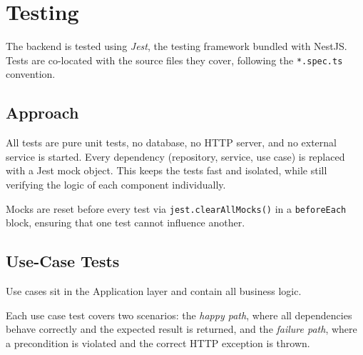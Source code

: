 \section{Testing}\label{sec:testing}

The backend is tested using \emph{Jest}, the testing framework bundled with NestJS.
Tests are co-located with the source files they cover, following the \texttt{*.spec.ts} convention.

\subsection{Approach}

All tests are pure unit tests, no database, no HTTP server, and no external service is started.
Every dependency (repository, service, use case) is replaced with a Jest mock object.
This keeps the tests fast and isolated, while still verifying the logic of each component individually.

Mocks are reset before every test via \texttt{jest.clearAllMocks()} in a \texttt{beforeEach} block, ensuring that one test cannot influence another.

\subsection{Use-Case Tests}

Use cases sit in the Application layer and contain all business logic.

Each use case test covers two scenarios: the \emph{happy path}, where all dependencies behave correctly and the expected result is returned, and the \emph{failure path}, where a precondition is violated and the correct HTTP exception is thrown.

